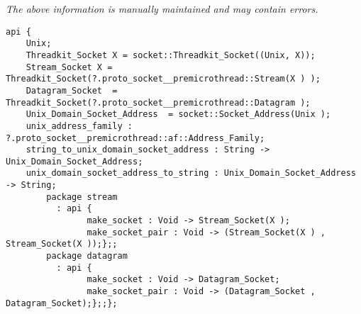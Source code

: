 \label{api:Unix\_Domain\_Socket}

{\tiny \it The above information is manually maintained and may contain errors.}
\begin{verbatim}
api {
    Unix;
    Threadkit_Socket X = socket::Threadkit_Socket((Unix, X));
    Stream_Socket X = Threadkit_Socket(?.proto_socket__premicrothread::Stream(X ) );
    Datagram_Socket  = Threadkit_Socket(?.proto_socket__premicrothread::Datagram );
    Unix_Domain_Socket_Address  = socket::Socket_Address(Unix );
    unix_address_family : ?.proto_socket__premicrothread::af::Address_Family;
    string_to_unix_domain_socket_address : String -> Unix_Domain_Socket_Address;
    unix_domain_socket_address_to_string : Unix_Domain_Socket_Address -> String;
        package stream
          : api {
                make_socket : Void -> Stream_Socket(X );
                make_socket_pair : Void -> (Stream_Socket(X ) , Stream_Socket(X ));};;
        package datagram
          : api {
                make_socket : Void -> Datagram_Socket;
                make_socket_pair : Void -> (Datagram_Socket , Datagram_Socket);};;};
\end{verbatim}

